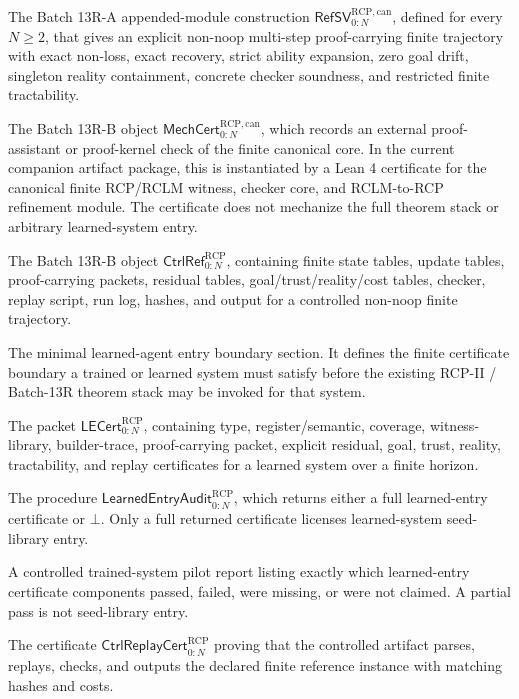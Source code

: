 \documentclass[11pt]{article}
\newcommand{\1}{\mathbf{1}}
\newcommand{\RCP}{\mathrm{RCP}}
\begin{document}
\begin{description}[leftmargin=2.7cm,style=nextline]
\item[Canonical finite RCP reference witness] The Batch 13R-A appended-module construction \(\mathsf{RefSV}_{0:N}^{\RCP,\mathrm{can}}\), defined for every \(N\ge2\), that gives an explicit non-noop multi-step proof-carrying finite trajectory with exact non-loss, exact recovery, strict ability expansion, zero goal drift, singleton reality containment, concrete checker soundness, and restricted finite tractability.
\item[External canonical mechanization certificate] The Batch 13R-B object \(\mathsf{MechCert}_{0:N}^{\RCP,\mathrm{can}}\), which records an external proof-assistant or proof-kernel check of the finite canonical core.  In the current companion artifact package, this is instantiated by a Lean 4 certificate for the canonical finite RCP/RCLM witness, checker core, and RCLM-to-RCP refinement module.  The certificate does not mechanize the full theorem stack or arbitrary learned-system entry.
\item[Controlled executable reference system] The Batch 13R-B object \(\mathsf{CtrlRef}_{0:N}^{\RCP}\), containing finite state tables, update tables, proof-carrying packets, residual tables, goal/trust/reality/cost tables, checker, replay script, run log, hashes, and output for a controlled non-noop finite trajectory.
\item[M3-Min] The minimal learned-agent entry boundary section. It defines the finite certificate boundary a trained or learned system must satisfy before the existing RCP-II / Batch-13R theorem stack may be invoked for that system.
\item[Learned-entry certificate] The packet \(\mathsf{LECert}_{0:N}^{\RCP}\), containing type, register/semantic, coverage, witness-library, builder-trace, proof-carrying packet, explicit residual, goal, trust, reality, tractability, and replay certificates for a learned system over a finite horizon.
\item[Learned-entry audit] The procedure \(\mathsf{LearnedEntryAudit}_{0:N}^{\RCP}\), which returns either a full learned-entry certificate or \(\bot\). Only a full returned certificate licenses learned-system seed-library entry.
\item[Partial-pass report] A controlled trained-system pilot report listing exactly which learned-entry certificate components passed, failed, were missing, or were not claimed. A partial pass is not seed-library entry.
\item[Controlled replay certificate] The certificate \(\mathsf{CtrlReplayCert}_{0:N}^{\RCP}\) proving that the controlled artifact parses, replays, checks, and outputs the declared finite reference instance with matching hashes and costs.

\end{description}
\end{document}
